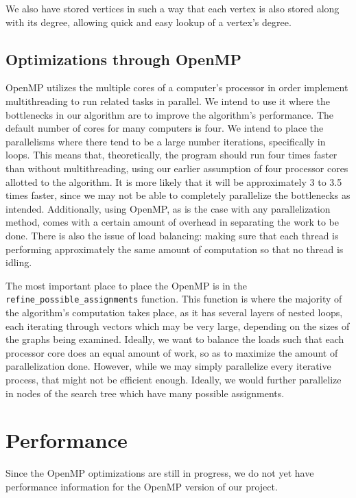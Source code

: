 \documentclass{article}
\begin{document}
  We also have stored vertices in such a way that each vertex is also stored along with its degree, allowing quick and easy lookup of a vertex's degree.

  \subsection{Optimizations through OpenMP}
  OpenMP utilizes the multiple cores of a computer's processor in order implement multithreading to run related tasks in parallel. We intend to use it where the bottlenecks in our algorithm are to improve the algorithm's performance. The default number of cores for many computers is four. We intend to place the parallelisms where there tend to be a large number iterations, specifically in loops. This means that, theoretically, the program should run four times faster than without multithreading, using our earlier assumption of four processor cores allotted to the algorithm. It is more likely that it will be approximately 3 to 3.5 times faster, since we may not be able to completely parallelize the bottlenecks as intended. Additionally, using OpenMP, as is the case with any parallelization method, comes with a certain amount of overhead in separating the work to be done. There is also the issue of load balancing: making sure that each thread is performing approximately the same amount of computation so that no thread is idling.

  The most important place to place the OpenMP is in the \texttt{refine\_possible\_assignments} function. This function is where the majority of the algorithm's computation takes place, as it has several layers of nested loops, each iterating through vectors which may be very large, depending on the sizes of the graphs being examined. Ideally, we want to balance the loads such that each processor core does an equal amount of work, so as to maximize the amount of parallelization done. However, while we may simply parallelize every iterative process, that might not be efficient enough. Ideally, we would further parallelize in nodes of the search tree which have many possible assignments.

\section{Performance}

  Since the OpenMP optimizations are still in progress, we do not yet have performance information for the OpenMP version of our project.
\end{document}
